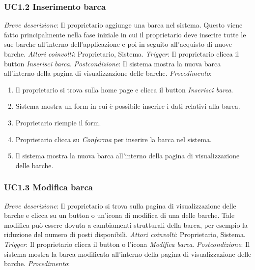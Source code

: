 \subsubsection{UC1.2 Inserimento barca}

\noindent \emph{Breve descrizione}: Il proprietario aggiunge una barca nel sistema. Questo viene fatto principalmente nella fase iniziale in cui il proprietario deve inserire
tutte le sue barche all'interno dell'applicazione e poi in seguito all'acquisto di nuove barche.\medbreak
\noindent \emph{Attori coinvolti}: Proprietario, Sistema.\medbreak
\noindent \emph{Trigger}: Il proprietario clicca il button \textit{Inserisci barca}.\medbreak
\noindent \emph{Postcondizione}: Il sistema mostra la nuova barca all'interno della pagina di visualizzazione delle barche.\medbreak
\noindent \emph{Procedimento}:

\begin{enumerate}
    \item Il proprietario si trova sulla home page e clicca il button \textit{Inserisci barca}.
    \item Sistema mostra un form in cui è possibile inserire i dati relativi alla barca.
    \item Proprietario riempie il form.
    \item Proprietario clicca su \textit{Conferma} per inserire la barca nel sistema.
    \item Il sistema mostra la nuova barca all'interno della pagina di visualizzazione delle barche.
\end{enumerate}

\subsubsection{UC1.3 Modifica barca}

\noindent \emph{Breve descrizione}: Il proprietario si trova sulla pagina di visualizzazione delle barche e clicca su un button o un'icona di modifica di una delle barche.
Tale modifica può essere dovuta a cambiamenti strutturali della barca, per esempio la riduzione del numero di posti disponibili.
\medbreak
\noindent \emph{Attori coinvolti}: Proprietario, Sistema.\medbreak
\noindent \emph{Trigger}: Il proprietario clicca il button o l'icona \textit{Modifica barca}.\medbreak
\noindent \emph{Postcondizione}: Il sistema mostra la barca modificata all'interno della pagina di visualizzazione delle barche.\medbreak
\noindent \emph{Procedimento}:

